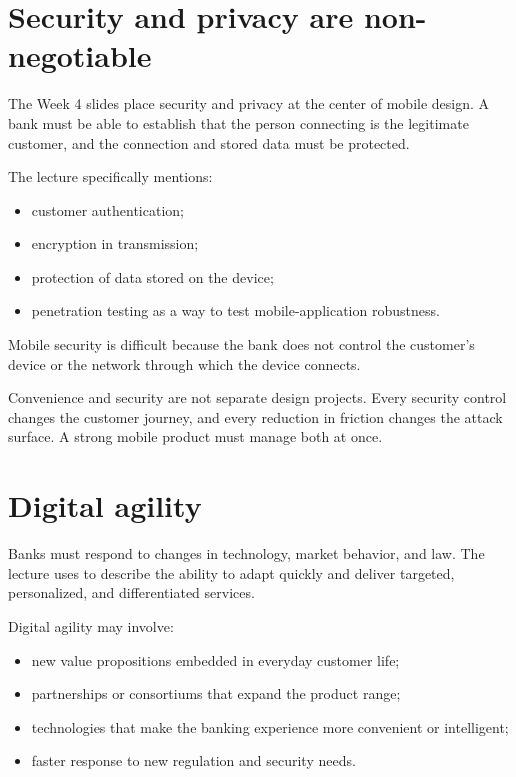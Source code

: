 \section{Security and privacy are non-negotiable}

The Week 4 slides place security and privacy at the center of mobile design. A bank must be able to establish that the person connecting is the legitimate customer, and the connection and stored data must be protected.

The lecture specifically mentions:

\begin{itemize}
  \item customer authentication;
  \item encryption in transmission;
  \item protection of data stored on the device;
  \item penetration testing as a way to test mobile-application robustness.
\end{itemize}

Mobile security is difficult because the bank does not control the customer's device or the network through which the device connects.

\begin{pitfall}
Convenience and security are not separate design projects. Every security control changes the customer journey, and every reduction in friction changes the attack surface. A strong mobile product must manage both at once.
\end{pitfall}

\section{Digital agility}

Banks must respond to changes in technology, market behavior, and law. The lecture uses  to describe the ability to adapt quickly and deliver targeted, personalized, and differentiated services.

Digital agility may involve:

\begin{itemize}
  \item new value propositions embedded in everyday customer life;
  \item partnerships or consortiums that expand the product range;
  \item technologies that make the banking experience more convenient or intelligent;
  \item faster response to new regulation and security needs.
\end{itemize}

